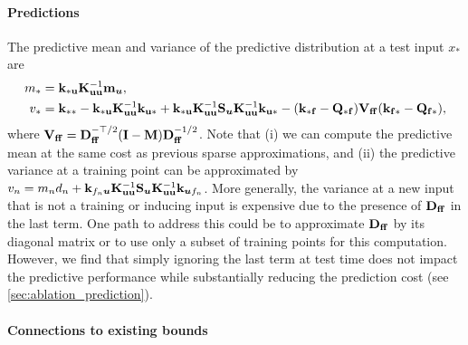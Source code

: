 \paragraph{Predictions}
The predictive mean and variance of the predictive distribution at a test input $x_*$ are
\begin{align}
\small
    m_* &= \mathbf{k}_{\mathbf{*u}} \mathbf{K}_{\mathbf{uu}}^{-1} {\mathbf{m}}_{\bm{u}}, \\
    v_* &= \mathbf{k}_{\mathbf{**}} - \mathbf{k}_{\mathbf{*u}} \mathbf{K}_{\mathbf{uu}}^{-1} \mathbf{k}_{\mathbf{u*}} + \mathbf{k}_{\mathbf{*u}} \mathbf{K}_{\mathbf{uu}}^{-1} {\mathbf{S}}_{\bm{u}} \mathbf{K}_{\mathbf{uu}}^{-1} \mathbf{k}_{\mathbf{u*}} - (\mathbf{k}_{\mathbf{*f}} - \mathbf{Q}_{\mathbf{*f}}) {\mathbf{V}}_{\mathbf{ff}} (\mathbf{k}_{\mathbf{f*}}- \mathbf{Q}_{\mathbf{f*}}), \label{eq:pred_var}
\end{align}
where ${\mathbf{V}}_\mathbf{ff} = \mathbf{D}_{\mathbf{ff}}^{-\top/2} ({\mathbf{I}} - {\mathbf{M}}) \mathbf{D}_{\mathbf{ff}}^{-1/2}$. Note that (i) we can compute the predictive mean at the same cost as previous sparse approximations, and (ii) the predictive variance at a training point can be approximated by $v_n = m_n d_n + \mathbf{k}_{f_n{\bm{u}}} \mathbf{K}_{\mathbf{uu}}^{-1} {\mathbf{S}}_{\bm{u}} \mathbf{K}_{\mathbf{uu}}^{-1} \mathbf{k}_{{\bm{u}} f_n}$. More generally, the variance at a new input that is not a training or inducing input is expensive due to the presence of $\mathbf{D}_{\mathbf{ff}}$ in the last term. One path to address this could be to approximate $\mathbf{D}_{\mathbf{ff}}$ by its diagonal matrix or to use only a subset of training points for this computation. However, we find that simply ignoring the last term at test time does not impact the predictive performance while substantially reducing the prediction cost (see \cref{sec:ablation_prediction}).

\paragraph{Connections to existing bounds}

